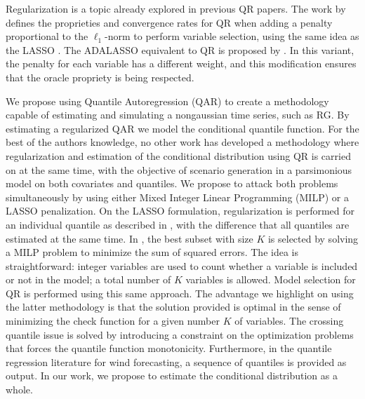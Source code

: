 Regularization is a topic already explored in previous QR papers.
The work by \cite{belloni_l1-penalized_2009} defines the proprieties and convergence rates for QR when adding a penalty proportional to the $\ell_1$-norm to perform variable selection, using the same idea as the LASSO \cite{tibshirani1996regression}. The ADALASSO equivalent to QR is proposed by \cite{ciuperca_adaptive_2016}. In this variant, the penalty for each variable has a different weight, and this modification ensures that the oracle propriety is being respected.

We propose using Quantile Autoregression (QAR) to create a methodology capable of estimating and simulating a nongaussian time series, such as RG. By estimating a regularized QAR we model the conditional quantile function.
For the best of the authors knowledge, no other work has developed a methodology where regularization and estimation of the conditional distribution using QR is carried on at the same time, with the objective of scenario generation in a parsimonious model on both covariates and quantiles. 
We propose to attack both problems simultaneously by using either Mixed Integer Linear Programming (MILP) or a LASSO penalization. On the LASSO formulation, regularization is performed for an individual quantile as described in \cite{belloni_l1-penalized_2009}, with the difference that all quantiles are estimated at the same time.
In \cite{bertsimas_best_2015}, the best subset with size $K$ is selected  by solving a MILP problem to minimize the sum of squared errors.
The idea is straightforward: integer variables are used to count whether a variable is included or not in the model; a total number of $K$ variables is allowed.
Model selection for QR is performed using this same approach. The advantage we highlight on using the latter methodology is that the solution provided is optimal in the sense of minimizing the check function for a given number $K$ of variables. The crossing quantile issue is solved by introducing a constraint on the optimization problems that forces the quantile function monotonicity.
Furthermore, in the quantile regression literature for wind forecasting, a sequence of quantiles is provided as output. In our work, we propose to estimate the conditional distribution as a whole.


